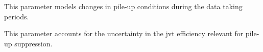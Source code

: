 \begin{description}[font=\normalfont]
\item[syst\_PRW\_DATASF:] This parameter models changes in pile-up conditions
  during the data taking periods.
\item[syst\_JvtEfficiency:] This parameter accounts for the uncertainty in the
  \gls{jvt} efficiency relevant for pile-up suppression.
\end{description}
